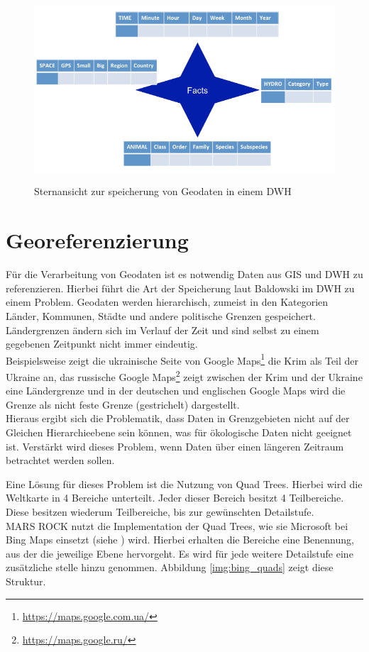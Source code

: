 \documentclass[10pt,conference,compsocconf]{IEEEtran}
\begin{document}
\begin{figure}[H]
  \centering
  	\includegraphics[width=\columnwidth]{img/star_schema}\\
  \caption[]{Sternansicht zur speicherung von Geodaten in einem DWH\cite{ThielClemen2013}}
  \label{img:star_schema}
\end{figure}


\section{Georeferenzierung}
Für die Verarbeitung von Geodaten ist es notwendig Daten aus GIS und DWH zu referenzieren. Hierbei führt die Art der Speicherung laut Baldowski\cite{mariuszMaster} im DWH zu einem Problem. Geodaten werden hierarchisch, zumeist in den Kategorien Länder, Kommunen, Städte und andere politische Grenzen gespeichert. Ländergrenzen ändern sich im Verlauf der Zeit und sind selbst zu einem gegebenen Zeitpunkt nicht immer eindeutig.\\
Beispielsweise zeigt die ukrainische Seite von Google Maps\footnote{\url{https://maps.google.com.ua/}} die Krim als Teil der Ukraine an, das russische Google Maps\footnote{\url{https://maps.google.ru/}} zeigt zwischen der Krim und der Ukraine eine Ländergrenze und in der deutschen und englischen Google Maps wird die Grenze als nicht feste Grenze (gestrichelt) dargestellt.\\
Hieraus ergibt sich die Problematik, dass Daten in Grenzgebieten nicht auf der Gleichen Hierarchieebene sein können, was für ökologische Daten nicht geeignet ist. Verstärkt wird dieses Problem, wenn Daten über einen längeren Zeitraum betrachtet werden sollen.\par

Eine Lösung für dieses Problem ist die Nutzung von Quad Trees\cite{quads}. Hierbei wird die Weltkarte in 4 Bereiche unterteilt. Jeder dieser Bereich besitzt 4 Teilbereiche. Diese besitzen wiederum Teilbereiche, bis zur gewünschten Detailstufe.\\
MARS ROCK nutzt die Implementation der Quad Trees, wie sie Microsoft bei Bing Maps einsetzt (siehe \cite{waldbiomasse}) wird. Hierbei erhalten die Bereiche eine Benennung, aus der die jeweilige Ebene hervorgeht. Es wird für jede weitere Detailstufe eine zusätzliche stelle hinzu genommen. Abbildung \ref{img:bing_quads} zeigt diese Struktur.
\end{document}
